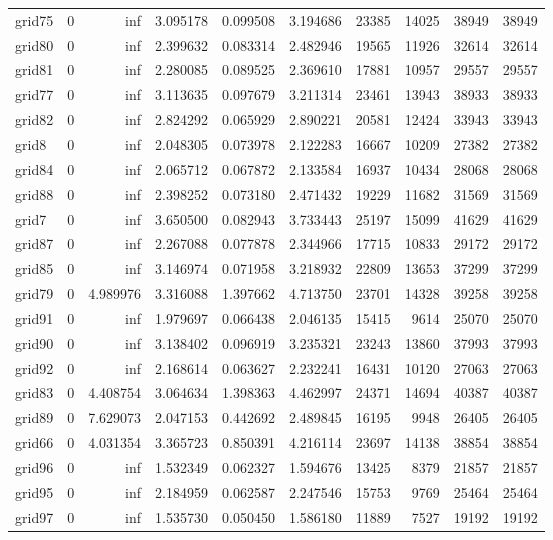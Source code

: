 \begin{longtable}{|l|r|r|r|r|r|r|r|r|r|}
grid75 & 0 & inf & 3.095178 & 0.099508 & 3.194686 & 23385 & 14025 & 38949 & 38949 \\
grid80 & 0 & inf & 2.399632 & 0.083314 & 2.482946 & 19565 & 11926 & 32614 & 32614 \\
grid81 & 0 & inf & 2.280085 & 0.089525 & 2.369610 & 17881 & 10957 & 29557 & 29557 \\
grid77 & 0 & inf & 3.113635 & 0.097679 & 3.211314 & 23461 & 13943 & 38933 & 38933 \\
grid82 & 0 & inf & 2.824292 & 0.065929 & 2.890221 & 20581 & 12424 & 33943 & 33943 \\
grid8 & 0 & inf & 2.048305 & 0.073978 & 2.122283 & 16667 & 10209 & 27382 & 27382 \\
grid84 & 0 & inf & 2.065712 & 0.067872 & 2.133584 & 16937 & 10434 & 28068 & 28068 \\
grid88 & 0 & inf & 2.398252 & 0.073180 & 2.471432 & 19229 & 11682 & 31569 & 31569 \\
grid7 & 0 & inf & 3.650500 & 0.082943 & 3.733443 & 25197 & 15099 & 41629 & 41629 \\
grid87 & 0 & inf & 2.267088 & 0.077878 & 2.344966 & 17715 & 10833 & 29172 & 29172 \\
grid85 & 0 & inf & 3.146974 & 0.071958 & 3.218932 & 22809 & 13653 & 37299 & 37299 \\
grid79 & 0 & 4.989976 & 3.316088 & 1.397662 & 4.713750 & 23701 & 14328 & 39258 & 39258 \\
grid91 & 0 & inf & 1.979697 & 0.066438 & 2.046135 & 15415 & 9614 & 25070 & 25070 \\
grid90 & 0 & inf & 3.138402 & 0.096919 & 3.235321 & 23243 & 13860 & 37993 & 37993 \\
grid92 & 0 & inf & 2.168614 & 0.063627 & 2.232241 & 16431 & 10120 & 27063 & 27063 \\
grid83 & 0 & 4.408754 & 3.064634 & 1.398363 & 4.462997 & 24371 & 14694 & 40387 & 40387 \\
grid89 & 0 & 7.629073 & 2.047153 & 0.442692 & 2.489845 & 16195 & 9948 & 26405 & 26405 \\
grid66 & 0 & 4.031354 & 3.365723 & 0.850391 & 4.216114 & 23697 & 14138 & 38854 & 38854 \\
grid96 & 0 & inf & 1.532349 & 0.062327 & 1.594676 & 13425 & 8379 & 21857 & 21857 \\
grid95 & 0 & inf & 2.184959 & 0.062587 & 2.247546 & 15753 & 9769 & 25464 & 25464 \\
grid97 & 0 & inf & 1.535730 & 0.050450 & 1.586180 & 11889 & 7527 & 19192 & 19192 \\

\end{longtable}
